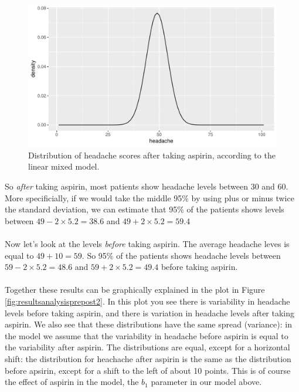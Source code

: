 \documentclass[]{book}\usepackage[]{graphicx}\usepackage[]{color}
\makeatletter
\def\maxwidth{ %
  \ifdim\Gin@nat@width>\linewidth
    \linewidth
  \else
    \Gin@nat@width
  \fi
}
\newenvironment{knitrout}{}{} %
\makeatother
\begin{document}
\begin{knitrout}
\color{fgcolor}\begin{figure}

{\centering \includegraphics[width=\maxwidth]{figure/resultsprepost1-1} 

}

\caption[Distribution of headache scores after taking aspirin, according to the linear mixed model]{Distribution of headache scores after taking aspirin, according to the linear mixed model.}\label{fig:resultsprepost1}
\end{figure}


\end{knitrout}

So \textit{after} taking aspirin, most patients show headache levels between 30 and 60. More specificially, if we would take the middle 95\% by using plus or minus twice the standard deviation, we can estimate that 95\% of the patients shows levels between $49 - 2 \times 5.2 = 38.6$ and $49 + 2 \times 5.2 = 59.4$
\\
\\
Now let's look at the levels \textit{before} taking aspirin. The average headache leves is equal to $49 + 10 = 59$. So 95\% of the patients shows headache levels between $59 - 2 \times 5.2 = 48.6$ and $59 + 2 \times 5.2 = 49.4$ before taking aspirin. 
\\
\\
Together these results can be graphically explained in the plot in Figure \ref{fig:resultsanalysisprepost2}. In this plot you see there is variability in headache levels before taking aspirin, and there is variation in headache levels after taking aspirin. We also see that these distributions have the same spread (variance): in the model we assume that the variability in headache before aspirin is equal to the variability after aspirin. The distributions are equal, except for a horizontal shift: the distribution for heachache after aspirin is the same as the distribution before apsirin, except for a shift to the left of about 10 points. This is of course the effect of aspirin in the model, the $b_1$ parameter in our model above.  
\end{document}
